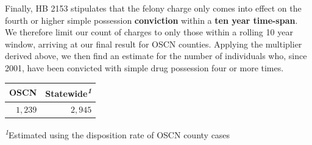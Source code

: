 \documentclass[
  letterpaper,
  DIV=11,
  numbers=noendperiod]{scrartcl}
\begin{document}
Finally, HB 2153 stipulates that the felony charge only comes into
effect on the fourth or higher simple possession \textbf{conviction}
within a \textbf{ten year time-span}. We therefore limit our count of
charges to only those within a rolling 10 year window, arriving at our
final result for OSCN counties. Applying the multiplier derived above,
we then find an estimate for the number of individuals who, since 2001,
have been convicted with simple drug possession four or more times.

\setlength{\LTpost}{0mm}
\begin{longtable*}{rr}
\toprule
OSCN & Statewide\textsuperscript{\textit{1}} \\ 
\midrule
$1,239$ & $2,945$ \\ 
\bottomrule
\end{longtable*}
\begin{minipage}{\linewidth}
\textsuperscript{\textit{1}}Estimated using the disposition rate of OSCN county cases\\
\end{minipage}
\end{document}
